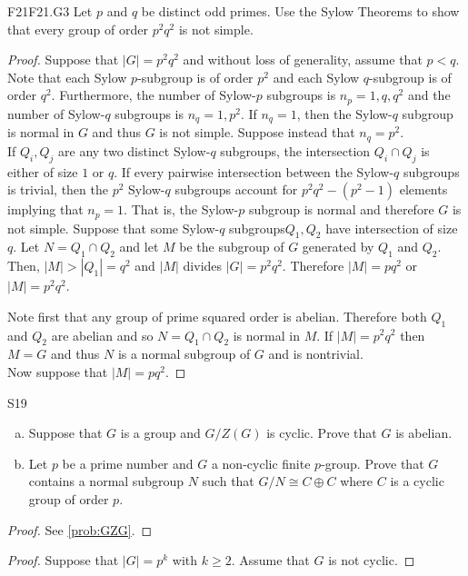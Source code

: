\documentclass[../AlgebraQualSolutions.tex]{subfiles}
\begin{document}
\begin{prob}{F21}{F21.G3}
Let $p$ and $q$ be distinct odd primes. Use the Sylow Theorems to show that every group of order $p^2q^2$ is not simple.
\end{prob}	

\begin{proof}
Suppose that $|G| = p^2q^2$ and without loss of generality, assume that $p < q$. Note that each Sylow $p$-subgroup is of order $p^2$ and each Sylow $q$-subgroup is of order $q^2$. Furthermore, the number of Sylow-$p$ subgroups is $n_p = 1, q, q^2$ and the number of Sylow-$q$ subgroups is $n_q = 1, p^2$. If $n_q = 1$, then the Sylow-$q$ subgroup is normal in $G$ and thus $G$ is not simple. Suppose instead that $n_q = p^2$.\\

If $Q_i, Q_j$ are any two distinct Sylow-$q$ subgroups, the intersection $Q_i \cap Q_j$ is either of size $1$ or $q$. If every pairwise intersection between the Sylow-$q$ subgroups is trivial, then the $p^2$ Sylow-$q$ subgroups account for $p^2q^2 - (p^2 -1)$ elements implying that $n_p = 1$. That is, the Sylow-$p$ subgroup is normal and therefore $G$ is not simple. Suppose that some Sylow-$q$ subgroups$Q_1, Q_2$ have intersection of size $q$. Let $N = Q_1 \cap Q_2$ and let $M$ be the subgroup of $G$ generated by $Q_1$ and $Q_2$. Then, $|M| > |Q_1| = q^2$ and $|M|$ divides $|G| = p^2q^2$. Therefore $|M| = pq^2$ or $|M| = p^2 q^2$. 

Note first that any group of prime squared order is abelian. Therefore both $Q_1$ and $Q_2$ are abelian and so $N = Q_1 \cap Q_2$ is normal in $M$. If $|M| = p^2q^2$ then $M=G$ and thus $N$ is a normal subgroup of $G$ and is nontrivial.\\

Now suppose that $|M| = pq^2$. 
\end{proof}

\begin{prob}{S19}{}
\begin{enumerate}[(a)]
\item Suppose that $G$ is a group and $G/Z(G)$ is cyclic. Prove  that $G$ is abelian.
\item Let $p$ be a prime number and $G$ a non-cyclic finite $p$-group. Prove that $G$ contains a normal subgroup $N$ such that $G/N \cong C \oplus C$ where $C$ is a cyclic group of order $p$.
\end{enumerate}
\end{prob}

\begin{proof}
See \ref{prob:GZG}.
\end{proof}

\begin{proof}
Suppose that $|G| = p^k$ with $k \geq 2$. Assume that $G$ is not cyclic.
\end{proof}
\end{document}
